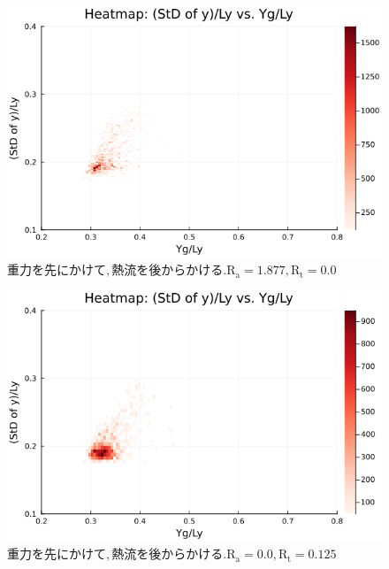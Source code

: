 \begin{figure}[H]
  \centering
  \includegraphics[scale=0.6]{image/RaRtmap_drop_heat/2023-12-21T10:44:57.455_RaRtmap_chi1.265_Ay50_rho0.4_T0.43_dT0.04_Rd0.0_Rt0.0_Ra1.877538_g0.0003999718779659611_run4.0e7.png}
  \caption{$重力を先にかけて, 熱流を後からかける. \text{R}_\text{a}=1.877,\text{R}_\text{t}=0.0$}
  \label{}
\end{figure}

\begin{figure}[H]
  \centering
  \includegraphics[scale=0.6]{image/RaRtmap_drop_heat/2023-12-21T10:44:57.529_RaRtmap_chi1.265_Ay50_rho0.4_T0.43_dT0.04_Rd0.0_Rt0.125_Ra0.0_g0.0003999718779659611_run4.0e7.png}
  \caption{$重力を先にかけて, 熱流を後からかける. \text{R}_\text{a}=0.0,\text{R}_\text{t}=0.125$}
  \label{}
\end{figure}

